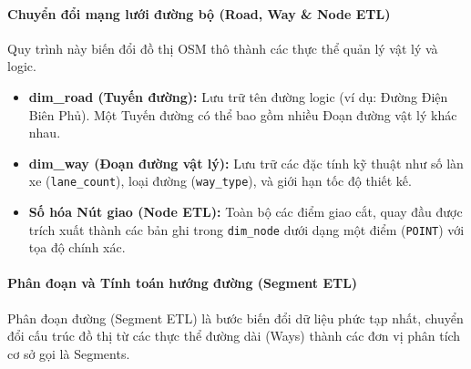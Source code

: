 \paragraph{ Chuyển đổi mạng lưới đường bộ (Road, Way \& Node ETL)}

Quy trình này biến đổi đồ thị OSM thô thành các thực thể quản lý vật lý và logic.
\begin{itemize}
    \item \textbf{dim\_road (Tuyến đường):} Lưu trữ tên đường logic (ví dụ: Đường Điện Biên Phủ). Một Tuyến đường có thể bao gồm nhiều Đoạn đường vật lý khác nhau.
    \item \textbf{dim\_way (Đoạn đường vật lý):} Lưu trữ các đặc tính kỹ thuật như số làn xe (\texttt{lane\_count}), loại đường (\texttt{way\_type}), và giới hạn tốc độ thiết kế.
    \item \textbf{Số hóa Nút giao (Node ETL):} Toàn bộ các điểm giao cắt, quay đầu được trích xuất thành các bản ghi trong \texttt{dim\_node} dưới dạng một điểm (\texttt{POINT}) với tọa độ chính xác.
\end{itemize}

\paragraph{Phân đoạn và Tính toán hướng đường (Segment ETL)}

Phân đoạn đường (Segment ETL) là bước biến đổi dữ liệu phức tạp nhất, chuyển đổi cấu trúc đồ thị từ các thực thể đường dài (Ways) thành các đơn vị phân tích cơ sở gọi là Segments.

